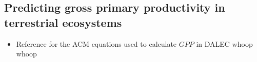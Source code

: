 \documentclass[11pt]{article}
\begin{document}
\subsection*{Predicting gross primary productivity in terrestrial ecosystems \cite{williams1997predicting}}
\begin{itemize}
\item Reference for the ACM equations used to calculate $GPP$ in DALEC whoop whoop
\end{itemize}


{}

\end{document}

